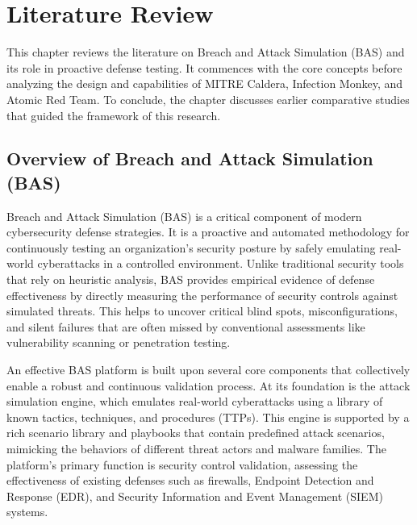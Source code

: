 \chapter{Literature Review} \label{chap:Literature}
This chapter reviews the literature on Breach and Attack Simulation (BAS) and its role in proactive defense testing. It commences with the core concepts before analyzing the design and capabilities of MITRE Caldera, Infection Monkey, and Atomic Red Team. To conclude, the chapter discusses earlier comparative studies that guided the framework of this research.

\section{Overview of Breach and Attack Simulation (BAS)}\label{sec:Overview_BAS}
Breach and Attack Simulation (BAS) is a critical component of modern cybersecurity defense strategies. It is a proactive and automated methodology for continuously testing an organization's security posture by safely emulating real-world cyberattacks in a controlled environment\cite{picus_bas}. Unlike traditional security tools that rely on heuristic analysis, BAS provides empirical evidence of defense effectiveness by directly measuring the performance of security controls against simulated threats. This helps to uncover critical blind spots, misconfigurations, and silent failures that are often missed by conventional assessments like vulnerability scanning or penetration testing\cite{mindgard_redteam}.

An effective BAS platform is built upon several core components that collectively enable a robust and continuous validation process. At its foundation is the attack simulation engine, which emulates real-world cyberattacks using a library of known tactics, techniques, and procedures (TTPs). This engine is supported by a rich scenario library and playbooks that contain predefined attack scenarios, mimicking the behaviors of different threat actors and malware families. The platform's primary function is security control validation, assessing the effectiveness of existing defenses such as firewalls, Endpoint Detection and Response (EDR), and Security Information and Event Management (SIEM) systems.

